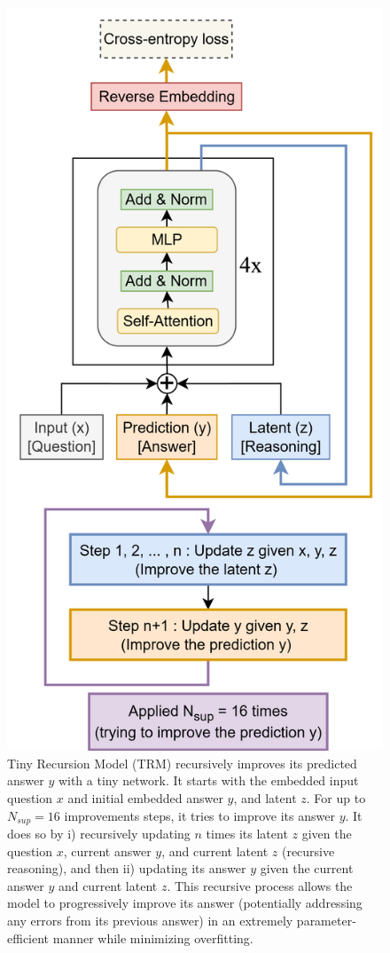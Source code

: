 \documentclass{article}
\theoremstyle{plain}
\theoremstyle{definition}
\theoremstyle{remark}
\begin{document}
\begin{figure}[H]
    \centering
    \includegraphics[width=0.75\linewidth]{TRM-Page-3.drawio.png}
    \caption{Tiny Recursion Model (TRM) recursively improves its predicted answer $y$ with a tiny network. It starts with the embedded input question $x$ and initial embedded answer $y$, and latent $z$. For up to $N_{sup}=16$ improvements steps, it tries to improve its answer $y$. It does so by i) recursively updating $n$ times its latent $z$ given the question $x$, current answer $y$, and current latent $z$ (recursive reasoning), and then ii) updating its answer $y$ given the current answer $y$ and current latent $z$. This recursive process allows the model to progressively improve its answer (potentially addressing any errors from its previous answer) in an extremely parameter-efficient manner while minimizing overfitting.}
    \label{fig:main}
\end{figure}
\end{document}

